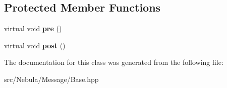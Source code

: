 \subsection*{\-Protected \-Member \-Functions}
\begin{DoxyCompactItemize}
\item 
\hypertarget{classNeb_1_1Message_1_1Base_a76f71f917625ae6da29f1372443c857f}{virtual void {\bfseries pre} ()}\label{classNeb_1_1Message_1_1Base_a76f71f917625ae6da29f1372443c857f}

\item 
\hypertarget{classNeb_1_1Message_1_1Base_ab1e20f766088e782e01cfb8208fdb4ac}{virtual void {\bfseries post} ()}\label{classNeb_1_1Message_1_1Base_ab1e20f766088e782e01cfb8208fdb4ac}

\end{DoxyCompactItemize}


\-The documentation for this class was generated from the following file\-:\begin{DoxyCompactItemize}
\item 
src/\-Nebula/\-Message/\-Base.\-hpp\end{DoxyCompactItemize}
